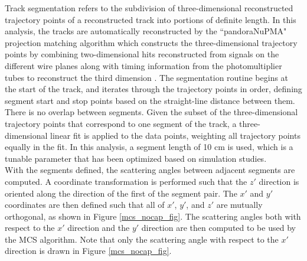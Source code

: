 \documentclass[a4paper,11pt]{article}
\begin{document}
Track segmentation refers to the subdivision of three-dimensional reconstructed trajectory points of a reconstructed track into portions of definite length. In this analysis, the tracks are automatically reconstructed by the ``pandoraNuPMA" projection matching algorithm which constructs the three-dimensional trajectory points by combining two-dimensional hits reconstructed from signals on the different wire planes along with timing information from the photomultiplier tubes to reconstruct the third dimension \cite{Marshall:2015rfa}. The segmentation routine begins at the start of the track, and iterates through the trajectory points in order, defining segment start and stop points based on the straight-line distance between them. There is no overlap between segments. Given the subset of the three-dimensional trajectory points that correspond to one segment of the track, a three-dimensional linear fit is applied to the data points, weighting all trajectory points equally in the fit. In this analysis, a segment length of 10 cm is used, which is a tunable parameter that has been optimized based on simulation studies.\\

With the segments defined, the scattering angles between adjacent segments are computed. A coordinate transformation is performed such that the $z'$ direction is oriented along the direction of the first of the segment pair. The $x'$ and $y'$ coordinates are then defined such that all of $x'$, $y'$, and $z'$ are mutually orthogonal, as shown in Figure \ref{mcs_nocap_fig}. The scattering angles both with respect to the $x'$ direction and the $y'$ direction are then computed to be used by the MCS algorithm. Note that only the scattering angle with respect to the $x'$ direction is drawn in Figure \ref{mcs_nocap_fig}.
\end{document}
